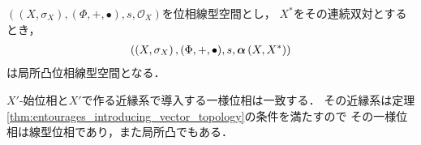 	\begin{screen}
		\begin{thm}[弱位相は局所凸]
			$\left((X,\sigma_X),(\Phi,+,\bullet),s,\mathscr{O}_X\right)$を位相線型空間とし，
			$X^*$をその連続双対とするとき，
			\begin{align}
				\left(\left(X,\sigma_X\right),(\Phi,+,\bullet),s,{\boldsymbol \alpha} \left(X,X^*\right)\right)
			\end{align}
			は局所凸位相線型空間となる．
		\end{thm}
	\end{screen}
	
	\begin{sketch}
		$X'$-始位相と$X'$で作る近縁系で導入する一様位相は一致する．
		その近縁系は定理\ref{thm:entourages_introducing_vector_topology}の条件を満たすので
		その一様位相は線型位相であり，また局所凸でもある．
	\end{sketch}